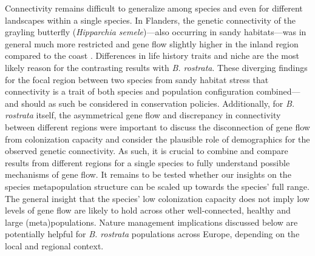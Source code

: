 \documentclass[10pt, twoside]{book} %
\begin{document}
	Connectivity remains difficult to generalize among species and even for different landscapes within a single species. In Flanders, the genetic connectivity of the grayling butterfly (\textit{Hipparchia semele})---also occurring in sandy habitats---was in general much more restricted and gene flow slightly higher in the inland region compared to the coast \citep{dero2021}. Differences in life history traits and niche are the most likely reason for the contrasting results with \textit{B. rostrata}. These diverging findings for the focal region between two species from sandy habitat stress that connectivity is a trait of both species and population configuration combined---and should as such be considered in conservation policies. Additionally, for \textit{B. rostrata} itself, the asymmetrical gene flow and discrepancy in connectivity between different regions were important to discuss the disconnection of gene flow from colonization capacity and consider the plausible role of demographics for the observed genetic connectivity. As such, it is crucial to combine and compare results from different regions for a single species to fully understand possible mechanisms of gene flow. It remains to be tested whether our insights on the species metapopulation structure can be scaled up towards the species' full range. The general insight that the species' low colonization capacity does not imply low levels of gene flow are likely to hold across other well-connected, healthy and large (meta)populations. Nature management implications discussed below are potentially helpful for \textit{B. rostrata} populations across Europe, depending on the local and regional context.\\
	
	
\end{document}
